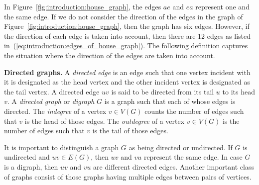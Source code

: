 In Figure~\ref{fig:introduction:house_graph}, the edges $ae$ and $ea$
represent one and the same edge. If we do not consider the direction
of the edges in the graph of
Figure~\ref{fig:introduction:house_graph}, then the graph has six
edges. However, if the direction of each edge is taken into account,
then there are 12 edges as listed
in~(\ref{eq:introduction:edges_of_house_graph}). The following
definition captures the situation where the direction of the edges are
taken into account.

\begin{definition}
\textbf{Directed graphs.}
A \emph{directed edge} is an edge such that one vertex incident with it
is designated as the head vertex and the other incident vertex is
designated as the tail vertex. A directed edge $uv$ is said to be
directed from its tail $u$ to its head $v$. A \emph{directed graph} or
\emph{digraph} $G$ is a graph such that each of whose edges is
directed. The \emph{indegree} of a vertex $v \in V(G)$ counts the
number of edges such that $v$ is the head of those edges. The
\emph{outdegree} of a vertex $v \in V(G)$ is the number of edges such
that $v$ is the tail of those edges.
\end{definition}

It is important to distinguish a graph $G$ as being directed or
undirected. If $G$ is undirected and $uv \in E(G)$, then $uv$ and $vu$
represent the same edge. In case $G$ is a digraph, then $uv$ and $vu$
are different directed edges. Another important class of graphs
consist of those graphs having multiple edges between pairs of
vertices.

